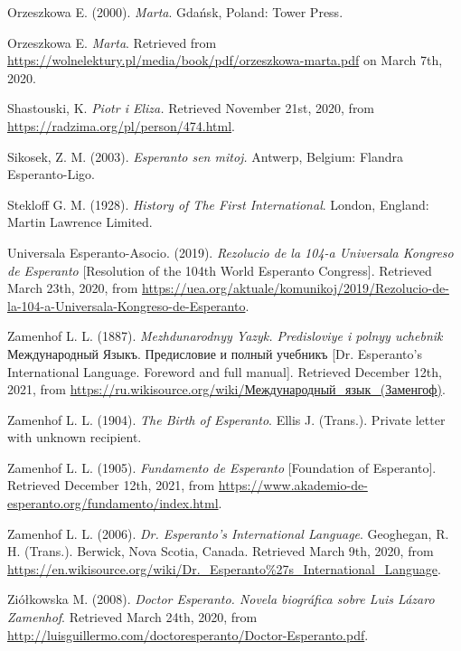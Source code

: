 Orzeszkowa E. (2000). \textit{Marta}. Gdańsk, Poland: Tower Press.

Orzeszkowa E. \textit{Marta}. Retrieved from \url{https://wolnelektury.pl/media/book/pdf/orzeszkowa-marta.pdf} on March 7th, 2020.


Shastouski, K. \textit{Piotr i Eliza.} Retrieved November 21st, 2020, from \url{https://radzima.org/pl/person/474.html}.

Sikosek, Z. M. (2003). \textit{Esperanto sen mitoj.} Antwerp, Belgium: Flandra Esperanto-Ligo. 

Stekloff G. M. (1928). \textit{History of The First International}. London, England: Martin Lawrence Limited.

Universala Esperanto-Asocio. (2019). \textit{Rezolucio de la 104-a Universala Kongreso de Esperanto} [Resolution of the 104th World Esperanto Congress]. Retrieved March 23th, 2020, from \url{https://uea.org/aktuale/komunikoj/2019/Rezolucio-de-la-104-a-Universala-Kongreso-de-Esperanto}.

Zamenhof L. L. (1887). \textit{Mezhdunarodnyy Yazyk. Predisloviye i polnyy uchebnik} {\cyrfont Между\-на\-род\-ный Языкъ. Предисловие и полный учебникъ} [Dr. Esperanto's International Language. Foreword and full manual]. Retrieved December 12th, 2021, from \url{https://ru.wikisource.org/wiki/Международный_язык_(Заменгоф)}.

Zamenhof L. L. (1904). \textit{The Birth of Esperanto}. Ellis J. (Trans.). Private letter with unknown recipient.

Zamenhof L. L. (1905). \textit{Fundamento de Esperanto} [Foundation of Esperanto]. Retrieved December 12th, 2021, from \url{https://www.akademio-de-esperanto.org/fundamento/index.html}.

Zamenhof L. L. (2006). \textit{Dr. Esperanto's International Language}. Geoghegan, R. H. (Trans.). Berwick, Nova Scotia, Canada. Retrieved March 9th, 2020, from \url{https://en.wikisource.org/wiki/Dr._Esperanto\%27s_International_Language}.

Ziółkowska M. (2008). \textit{Doctor Esperanto. Novela biográfica sobre Luis Lázaro Zamenhof}. Retrieved March 24th, 2020, from \url{http://luisguillermo.com/doctoresperanto/Doctor-Esperanto.pdf}.
